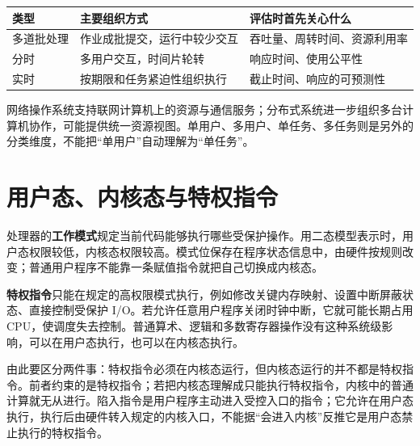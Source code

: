 \begin{wideblock}

\par\medskip\noindent\begin{minipage}{\linewidth}\fontsize{9.3}{12}\selectfont\begin{tabularx}{\linewidth}{@{}YYY@{}}
\toprule\noalign{}
\begin{minipage}[b]{\linewidth}\raggedright
类型
\end{minipage} & \begin{minipage}[b]{\linewidth}\raggedright
主要组织方式
\end{minipage} & \begin{minipage}[b]{\linewidth}\raggedright
评估时首先关心什么
\end{minipage} \\
\midrule\noalign{}


多道批处理 & 作业成批提交，运行中较少交互 & 吞吐量、周转时间、资源利用率 \\
分时 & 多用户交互，时间片轮转 & 响应时间、使用公平性 \\
实时 & 按期限和任务紧迫性组织执行 & 截止时间、响应的可预测性 \\
\bottomrule\end{tabularx}
\end{minipage}\par\medskip

\end{wideblock}

网络操作系统支持联网计算机上的资源与通信服务；分布式系统进一步组织多台计算机协作，可能提供统一资源视图。单用户、多用户、单任务、多任务则是另外的分类维度，不能把``单用户''自动理解为``单任务''。

\section{用户态、内核态与特权指令}\label{OS01-1-3}

处理器的\textbf{工作模式}规定当前代码能够执行哪些受保护操作。用二态模型表示时，用户态权限较低，内核态权限较高。模式位保存在程序状态信息中，由硬件按规则改变；普通用户程序不能靠一条赋值指令就把自己切换成内核态。

\textbf{特权指令}只能在规定的高权限模式执行，例如修改关键内存映射、设置中断屏蔽状态、直接控制受保护 I/O。若允许任意用户程序关闭时钟中断，它就可能长期占用 CPU，使调度失去控制。普通算术、逻辑和多数寄存器操作没有这种系统级影响，可以在用户态执行，也可以在内核态执行。

由此要区分两件事：特权指令必须在内核态运行，但内核态运行的并不都是特权指令。前者约束的是特权指令；若把内核态理解成只能执行特权指令，内核中的普通计算就无从进行。陷入指令是用户程序主动进入受控入口的指令；它允许在用户态执行，执行后由硬件转入规定的内核入口，不能据``会进入内核''反推它是用户态禁止执行的特权指令。

